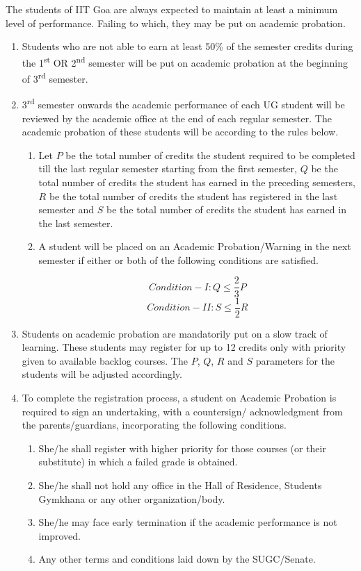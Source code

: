The students of IIT Goa are always expected to maintain at least a minimum level of performance. Failing to which, they may be put on academic probation.

\begin{enumerate}
    \item Students who are not able to earn at least 50\% of the semester credits during the 1\textsuperscript{st} OR 2\textsuperscript{nd} semester will be put on academic probation at the beginning of 3\textsuperscript{rd} semester.
    \item 3\textsuperscript{rd} semester onwards the academic performance of each UG student will be reviewed by the academic office at the end of each regular semester. The academic probation of these students will be according to the rules below.

    \begin{enumerate}
        \item Let $P$ be the total number of credits the student required to be completed till the last regular semester starting from the first semester, $Q$ be the total number of credits the student has earned in the preceding semesters, $R$ be the total number of credits the student has registered in the last semester and $S$ be the total number of credits the student has earned in the last semester.
        \item A student will be placed on an Academic Probation/Warning in the next semester if either or both of the following conditions are satisfied.

        \[Condition-I : Q \leq \frac{2}{3}P\]
        \[Condition-II : S\leq \frac{1}{2}R\]
        
    \end{enumerate}

    \item Students on academic probation are mandatorily put on a slow track of learning. These students may register for up to 12 credits only with priority given to available backlog courses. The  $P$, $Q$, $R$ and $S$ parameters for the students will be adjusted accordingly.
    \item To complete the registration process, a student on Academic Probation is required to sign an undertaking, with a countersign/ acknowledgment from the parents/guardians, incorporating the following conditions. 

    \begin{enumerate}
        \item She/he shall register with higher priority for those courses (or their substitute) in which a failed grade is obtained.
        \item She/he shall not hold any office in the Hall of Residence, Students Gymkhana or any other organization/body.
        \item She/he may face early termination if the academic performance is not improved.
        \item Any other terms and conditions laid down by the SUGC/Senate.
    \end{enumerate}


\end{enumerate}
